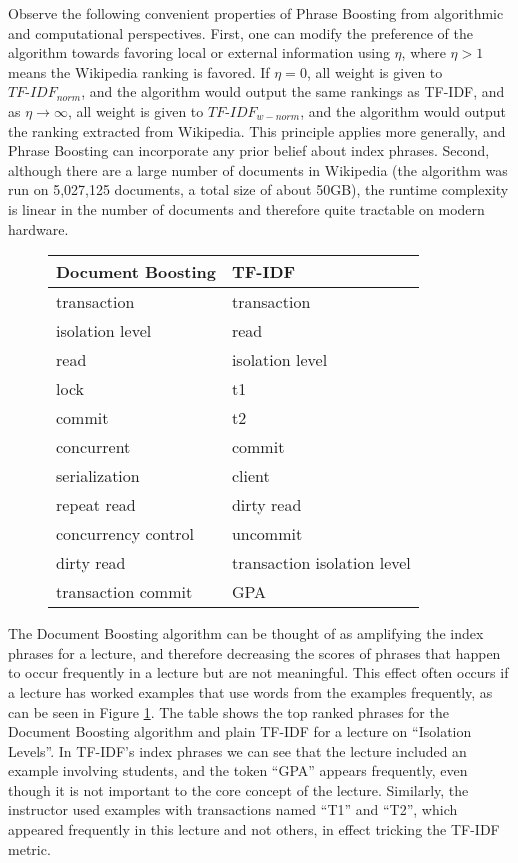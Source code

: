 Observe the following convenient properties of Phrase Boosting from
algorithmic and computational perspectives. First, one can modify the
preference of the algorithm towards favoring local or external
information using $\eta$, where $\eta > 1$ means the Wikipedia ranking
is favored. If $\eta = 0$, all weight is given to $TF\text{-}IDF_{norm}$,
and the algorithm would output the same rankings as TF-IDF, and as
$\eta \to \infty$, all weight is given to $TF\text{-}IDF_{w-norm}$, and
the algorithm would output the ranking extracted from Wikipedia. This
principle applies more generally, and Phrase Boosting can incorporate
any prior belief about index phrases. Second, although there are a large number of documents in Wikipedia (the algorithm was run on 5,027,125 documents, a total size of about 50GB), the runtime complexity is linear in the number of documents and therefore quite tractable on modern hardware.


\begin{figure}[h!]
\caption{}
\label{fig:document_boosting_v_tfidf}
\begin{tabular}{|l|l|}
\hline
\textbf{Document Boosting} & \textbf{TF-IDF} \\
\hline
transaction & transaction \\
\hline
isolation level & read \\
\hline
read & isolation level \\
\hline
lock & t1 \\
\hline
commit & t2 \\
\hline
concurrent & commit \\
\hline
serialization & client \\
\hline
repeat read & dirty read \\
\hline
concurrency control & uncommit \\
\hline
dirty read & transaction isolation level \\
\hline
transaction commit & GPA \\
\hline
\end{tabular}
\end{figure}

The Document Boosting algorithm can be thought of as amplifying the
index phrases for a lecture, and therefore decreasing the scores of
phrases that happen to occur frequently in a lecture but are not
meaningful. This effect often occurs if a lecture has worked examples that
use words from the examples frequently, as can be seen in Figure
\ref{fig:document_boosting_v_tfidf}. The table shows the top ranked
phrases for the Document Boosting algorithm and plain TF-IDF for a
lecture on ``Isolation Levels''. In TF-IDF's index phrases we can see
that the lecture included an example involving students, and the token ``GPA'' appears frequently, even though it is not important to the core concept of the lecture. Similarly, the instructor used examples with transactions named ``T1'' and ``T2'', which appeared frequently in this lecture and not others, in effect tricking the TF-IDF metric.


